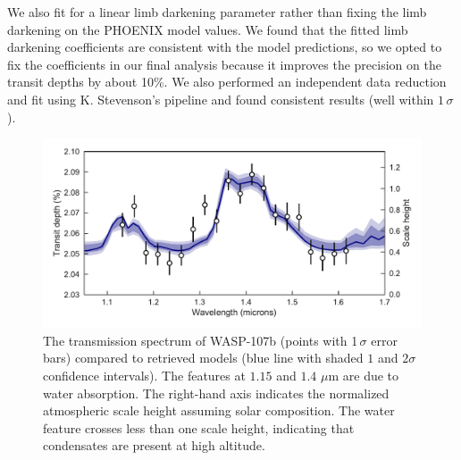 \documentclass[twocolumn, trackchanges]{aastex61}
\begin{document}
We also fit for a linear limb darkening parameter rather than fixing the limb darkening on the PHOENIX model values. We found that the fitted limb darkening coefficients are consistent with the model predictions, so we opted to fix the coefficients in our final analysis because it improves the precision on the transit depths by about 10\%.  We also performed an independent data reduction and fit using K. Stevenson's pipeline and found consistent results (well within $1\,\sigma$). 



\begin{figure}
\includegraphics[width = \textwidth]{Figures/fig2_spectrum.pdf}
\caption{The transmission spectrum of WASP-107b (points with 1\,$\sigma$ error bars) compared to retrieved models (blue line with shaded $1$ and $2\sigma$ confidence intervals). The features at $1.15$ and $1.4$ $\mu$m are due to water absorption. The right-hand axis indicates the normalized atmospheric scale height assuming solar composition. The water feature crosses less than one scale height, indicating that condensates are present at high altitude.} 
\label{fig:spectrum}
\end{figure}
\end{document}
